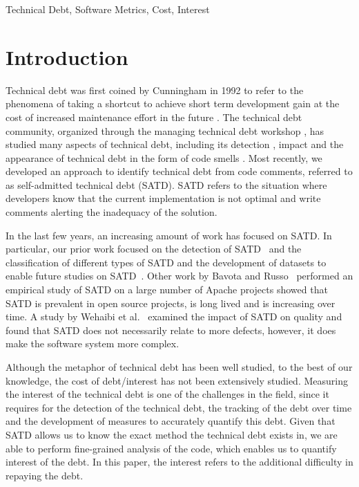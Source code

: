 \documentclass[10pt, conference]{IEEEtran}
\begin{document}
\begin{IEEEkeywords}
Technical Debt, Software Metrics, Cost, Interest
\end{IEEEkeywords}

\IEEEpeerreviewmaketitle

\section{Introduction}
Technical debt was first coined by Cunningham in 1992 to refer to the phenomena of taking a shortcut to achieve short term development gain at the cost of increased maintenance effort in the future \cite{Cunningham1992WPM}. The technical debt community, organized through the managing technical debt workshop \cite{MTD2016}, has studied many aspects of technical debt, including its detection \cite{Zazworka2013EASE}, impact \cite{Zazworka2011MTD} and the appearance of technical debt in the form of code smells \cite{Fontana2012MTD}. Most recently, we developed an approach to identify technical debt from code comments, referred to as self-admitted technical debt (SATD). SATD refers to the situation where developers know that the current implementation is not optimal and write comments alerting the inadequacy of the solution. 


In the last few years, an increasing amount of work has focused on SATD. In particular, our prior work focused on the detection of SATD~\cite{Potdar2014ICSME,Maldonado_TSE2017} and the classification of different types of SATD and the development of datasets to enable future studies on SATD~\cite{Maldonado2015MTD}. Other work by Bavota and Russo~\cite{Bavota2016MSR} performed an empirical study of SATD on a large number of Apache projects showed that SATD is prevalent in open source projects, is long lived and is increasing over time. A study by Wehaibi et al.~\cite{Wehaibi2016SANER} examined the impact of SATD on quality and found that SATD does not necessarily relate to more defects, however, it does make the software system more complex. 

Although the metaphor of technical debt has been well studied, to the best of our knowledge, the cost of debt/interest has not been extensively studied. Measuring the interest of the technical debt is one of the challenges in the field, since it requires for the detection of the technical debt, the tracking of the debt over time and the development of measures to accurately quantify this debt. Given that SATD allows us to know the exact method the technical debt exists in, we are able to perform fine-grained analysis of the code, which enables us to quantify interest of the debt. In this paper, the interest refers to the additional difficulty in repaying the debt.
\end{document}

